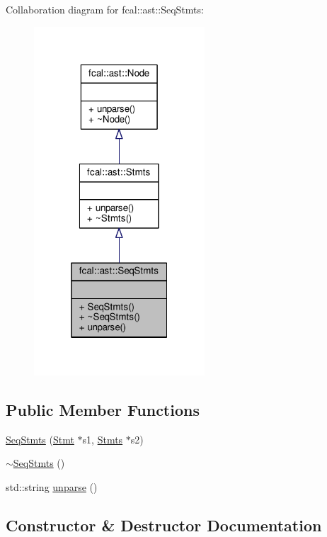 Collaboration diagram for fcal\+:\+:ast\+:\+:Seq\+Stmts\+:
\nopagebreak
\begin{figure}[H]
\begin{center}
\leavevmode
\includegraphics[width=181pt]{classfcal_1_1ast_1_1SeqStmts__coll__graph}
\end{center}
\end{figure}
\subsection*{Public Member Functions}
\begin{DoxyCompactItemize}
\item 
\hyperlink{classfcal_1_1ast_1_1SeqStmts_ac6ab4de26772db0a53d44c8742abd039}{Seq\+Stmts} (\hyperlink{classfcal_1_1ast_1_1Stmt}{Stmt} $\ast$s1, \hyperlink{classfcal_1_1ast_1_1Stmts}{Stmts} $\ast$s2)
\item 
\hyperlink{classfcal_1_1ast_1_1SeqStmts_a3c3446286e42c2df1b626852d3ce0728}{$\sim$\+Seq\+Stmts} ()
\item 
std\+::string \hyperlink{classfcal_1_1ast_1_1SeqStmts_af4d437d57e334a6500ae7639d6eefbcc}{unparse} ()
\end{DoxyCompactItemize}


\subsection{Constructor \& Destructor Documentation}

